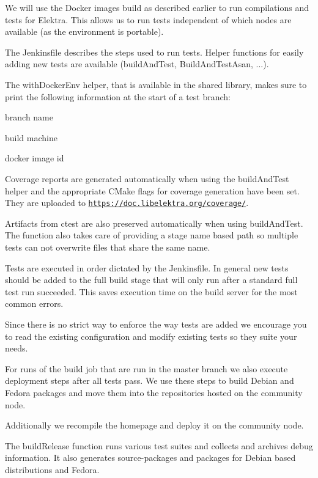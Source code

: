 We will use the Docker images build as described earlier to run compilations and tests for Elektra. This allows us to run tests independent of which nodes are available (as the environment is portable).

The Jenkinsfile describes the steps used to run tests. Helper functions for easily adding new tests are available ({\ttfamily build\+And\+Test}, {\ttfamily Build\+And\+Test\+Asan}, ...).

The {\ttfamily with\+Docker\+Env} helper, that is available in the shared library, makes sure to print the following information at the start of a test branch\+:


\begin{DoxyItemize}
\item branch name
\item build machine
\item docker image id
\end{DoxyItemize}

Coverage reports are generated automatically when using the {\ttfamily build\+And\+Test} helper and the appropriate C\+Make flags for coverage generation have been set. They are uploaded to \href{https://doc.libelektra.org/coverage/}{\tt https\+://doc.\+libelektra.\+org/coverage/}.

Artifacts from {\ttfamily ctest} are also preserved automatically when using {\ttfamily build\+And\+Test}. The function also takes care of providing a stage name based path so multiple tests can not overwrite files that share the same name.

Tests are executed in order dictated by the Jenkinsfile. In general new tests should be added to the \textquotesingle{}full build stage\textquotesingle{} that will only run after a standard full test run succeeded. This saves execution time on the build server for the most common errors.

Since there is no strict way to enforce the way tests are added we encourage you to read the existing configuration and modify existing tests so they suite your needs.

For runs of the build job that are run in the master branch we also execute deployment steps after all tests pass. We use these steps to build Debian and Fedora packages and move them into the repositories hosted on the community node.

Additionally we recompile the homepage and deploy it on the community node.

The {\ttfamily build\+Release} function runs various test suites and collects and archives debug information. It also generates source-\/packages and packages for Debian based distributions and Fedora.

